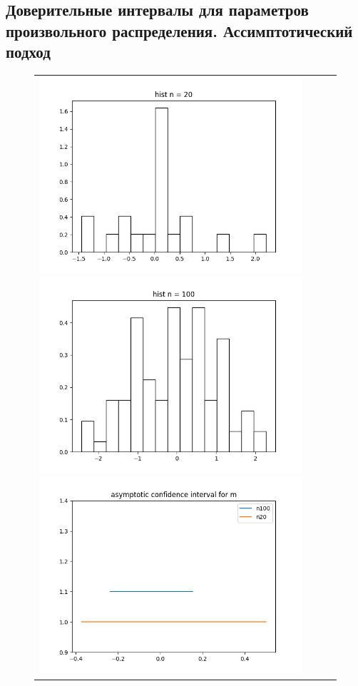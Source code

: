 \subsection{Доверительные интервалы для параметров произвольного распределения. Ассимптотический подход}


\begin{figure}[H]
	\begin{tabular}{cccc}
		\includegraphics[scale=0.3]{hist_n_20.png}
		\includegraphics[scale=0.3]{hist_n_100.png}
		\includegraphics[scale=0.3]{asymptotic_m.png}

\end{tabular}
\end{figure}
